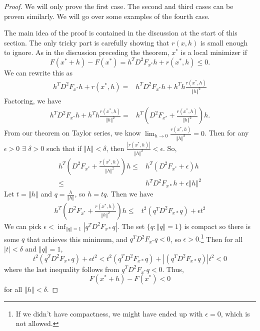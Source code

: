 \documentclass[12pt,reqno]{amsart}
\theoremstyle{definition}
\newcommand{\norm}[1]{\left\Vert {#1} \right\Vert}
\renewcommand{\to}{{\rightarrow}}
\begin{document}
\begin{proof}
  We will only prove the first case. The second and third cases can be
  proven similarly. We will go over some examples of the fourth
  case. 
  
  The main idea of the proof is contained in the discussion at the
  start of this section. The only tricky part is carefully showing
  that $r(x,h)$ is small enough to ignore.  As in the discussion
  preceding the theorem, $x^*$ is a local minimizer if
  \[ F(x^*+h) - F(x^*) = h^T D^2 F_{x^*} h + r(x^*,h) \leq 0. \]
  We can rewrite this as
  \begin{align*}
    h^T D^2 F_{x^*} h + r(x^*,h) = & h^T D^2 F_{x^*} h + h^T h
    \frac{r(x^*,h)}{\norm{h}^2} 
  \end{align*}
  Factoring, we have
  \begin{align*}
    h^T D^2 F_{x^*} h + h^T h \frac{r(x^*,h)}{\norm{h}^2} = 
    & 
    h^T \left( D^2 F_{x^*}+ \frac{r(x^*,h)}{\norm{h}^2} \right) h.
  \end{align*}
  From our theorem on Taylor series, we know $\lim_{h \to 0}
  \frac{r(x^*,h)}{\norm{h}^2} = 0$. Then for any $\epsilon > 0$
  $\exists$ $\delta > 0$ such that if $\norm{h} < \delta$, then
  $\frac{|r(x^*,h)|}{\norm{h}^2} < \epsilon$. So,
  \begin{align*}
    h^T \left( D^2 F_{x^*}+ \frac{r(x^*,h)}{\norm{h}^2} \right) h
    \leq & h^T \left( D^2 F_{x^*}+ \epsilon \right) h \\
    \leq & h^T D^2 F_{x*} h + \epsilon \norm{h}^2
  \end{align*}
  Let $t = \norm{h}$ and $q = \frac{h}{\norm{h}}$, so $h = t q$. 
  Then we have
   \begin{align*}
    h^T \left( D^2 F_{x^*}+ \frac{r(x^*,h)}{\norm{h}^2} \right) h
    \leq & t^2 (q^T D^2 F_{x*} q) + \epsilon t^2
  \end{align*}
  We can pick $\epsilon < \inf_{\norm{q} =1} |q^T D^2
  F_{x*} q|$. The set $\{q: \norm{q} = 1\}$ is compact so there is
  some $q$ that achieves this minimum, and $q^T D^2 F_{x^*} q < 0$, so
  $\epsilon >0$.\footnote{If we didn't have compactness, we might have ended
    up with $\epsilon =0$, which is not allowed.} 
  Then for all $|t|<\delta$ and $\norm{q} = 1$, 
  \[ t^2 (q^T D^2 F_{x*} q) + \epsilon t^2 < t^2
  (q^T D^2 F_{x*} q) + |(q^T D^2 F_{x*} q)|t^2 < 0 \]
  where the last inequality follows from $q^T D^2 F_{x^*} q< 0$.
  Thus, 
  \[  F(x^*+h) - F(x^*) < 0 \]
  for all $\norm{h} < \delta$.
\end{proof}
\end{document}
